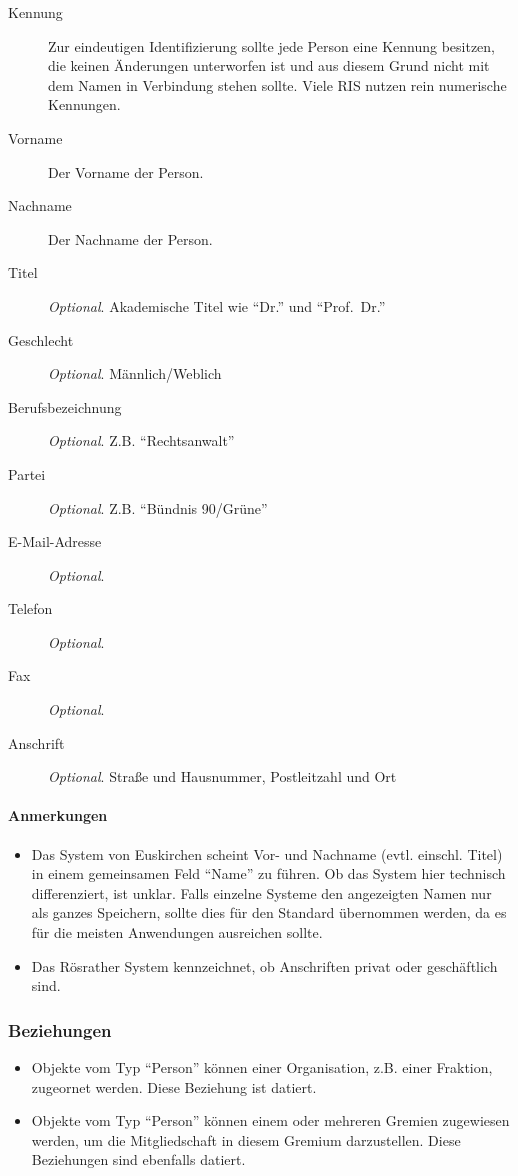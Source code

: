 \documentclass[,a4paper]{article}
\begin{document}
\begin{description}
\item[Kennung]
Zur eindeutigen Identifizierung sollte jede Person eine Kennung
besitzen, die keinen Änderungen unterworfen ist und aus diesem Grund
nicht mit dem Namen in Verbindung stehen sollte. Viele RIS nutzen rein
numerische Kennungen.
\item[Vorname]
Der Vorname der Person.
\item[Nachname]
Der Nachname der Person.
\item[Titel]
\emph{Optional}. Akademische Titel wie ``Dr.'' und ``Prof.~Dr.''
\item[Geschlecht]
\emph{Optional}. Männlich/Weblich
\item[Berufsbezeichnung]
\emph{Optional}. Z.B. ``Rechtsanwalt''
\item[Partei]
\emph{Optional}. Z.B. ``Bündnis 90/Grüne''
\item[E-Mail-Adresse]
\emph{Optional}.
\item[Telefon]
\emph{Optional}.
\item[Fax]
\emph{Optional}.
\item[Anschrift]
\emph{Optional}. Straße und Hausnummer, Postleitzahl und Ort
\end{description}

\paragraph{Anmerkungen}

\begin{itemize}
\item
  Das System von Euskirchen scheint Vor- und Nachname (evtl. einschl.
  Titel) in einem gemeinsamen Feld ``Name'' zu führen. Ob das System
  hier technisch differenziert, ist unklar. Falls einzelne Systeme den
  angezeigten Namen nur als ganzes Speichern, sollte dies für den
  Standard übernommen werden, da es für die meisten Anwendungen
  ausreichen sollte.
\item
  Das Rösrather System kennzeichnet, ob Anschriften privat oder
  geschäftlich sind.
\end{itemize}

\subsubsection{Beziehungen}

\begin{itemize}
\item
  Objekte vom Typ ``Person'' können einer Organisation, z.B. einer
  Fraktion, zugeornet werden. Diese Beziehung ist datiert.
\item
  Objekte vom Typ ``Person'' können einem oder mehreren Gremien
  zugewiesen werden, um die Mitgliedschaft in diesem Gremium
  darzustellen. Diese Beziehungen sind ebenfalls datiert.
\end{itemize}
\end{document}
